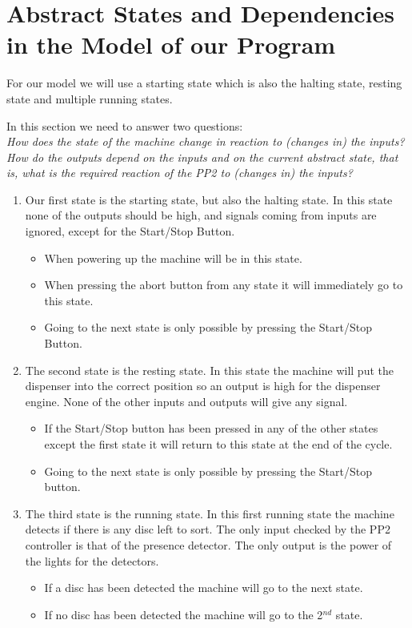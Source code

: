 \documentclass[a4paper,oneside,11pt]{report}
\begin{document}
\section{Abstract States and Dependencies in the Model of our Program}
For our model we will use a starting state which is also the halting state, resting state and multiple running states.

In this section we need to answer two questions:\\
\emph{How does the state of the machine change in reaction to (changes in) the inputs?\\
How do the outputs depend on the inputs and on the current abstract state, that is, what is the required reaction of the PP2 to (changes in) the inputs?}

\begin{enumerate}
\item Our first state is the starting state, but also the halting state. In this state none of the outputs should be high, and signals coming from inputs are ignored, except for the Start/Stop Button.
\begin{itemize}
\item When powering up the machine will be in this state.
\item When pressing the abort button from any state it will immediately go to this state.
\item Going to the next state is only possible by pressing the Start/Stop Button.
\end{itemize}

\item The second state is the resting state. In this state the machine will put the dispenser into the correct position so an output is high for the dispenser engine. None of the other inputs and outputs will give any signal.
    \begin{itemize}
        \item If the Start/Stop button has been pressed in any of the other states except the first state it will return to this state at the end of the cycle.
        \item Going to the next state is only possible by pressing the Start/Stop button.
    \end{itemize}

\item The third state is the running state. In this first running state the machine detects if there is any disc left to sort. The only input checked by the PP2 controller is that of the presence detector. The only output is the power of the lights for the detectors.
    \begin{itemize}
        \item If a disc has been detected the machine will go to the next state.
        \item If no disc has been detected the machine will go to the 2\(^{nd}\) state.
    \end{itemize}


\end{enumerate}
\end{document}
